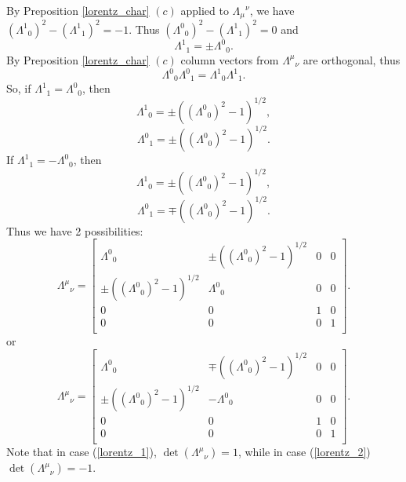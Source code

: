 \documentclass[main.tex]{subfiles}
\begin{document}
By Preposition \ref{lorentz_char} $(c)$ applied to ${\Lambda_\mu}^\nu$, we have  $({\Lambda^1}_0)^2 - ({\Lambda^1}_1)^2 = -1$. Thus $({\Lambda^0}_0)^2 - ({\Lambda^1}_1)^2 = 0$ and 
\begin{equation}
    {\Lambda^1}_1 = \pm {\Lambda^0}_0.
\end{equation}
By Preposition \ref{lorentz_char} $(c)$ column vectors from ${\Lambda^\mu}_\nu$ are orthogonal, thus
\begin{equation}
    {\Lambda^0}_0 {\Lambda^0}_1 =  {\Lambda^1}_0 {\Lambda^1}_1.
\end{equation}
So, if ${\Lambda^1}_1 = {\Lambda^0}_0$, then
\begin{equation}
    {\Lambda^1}_0 = \pm (({\Lambda^0}_0)^2 - 1)^{1/2},
\end{equation}
\begin{equation}
    {\Lambda^0}_1 = \pm (({\Lambda^0}_0)^2 - 1)^{1/2}.
\end{equation}
If ${\Lambda^1}_1 = -{\Lambda^0}_0$, then
\begin{equation}
    {\Lambda^1}_0 = \pm (({\Lambda^0}_0)^2 - 1)^{1/2},
\end{equation}
\begin{equation}
    {\Lambda^0}_1 = \mp (({\Lambda^0}_0)^2 - 1)^{1/2}.
\end{equation}
Thus we have 2 possibilities:
\begin{equation}
\label{lorentz_1}
    {\Lambda^\mu}_\nu =
    \begin{bmatrix}
    {\Lambda^0}_0 & \pm (({\Lambda^0}_0)^2 - 1)^{1/2} & 0 & 0 \\
    \pm (({\Lambda^0}_0)^2 - 1)^{1/2} & {\Lambda^0}_0 & 0 & 0 \\
    0 & 0 & 1 & 0 \\
    0 & 0 & 0 & 1 \\
\end{bmatrix}.
\end{equation}
or
\begin{equation}
\label{lorentz_2}
    {\Lambda^\mu}_\nu =
    \begin{bmatrix}
    {\Lambda^0}_0 & \mp (({\Lambda^0}_0)^2 - 1)^{1/2} & 0 & 0 \\
    \pm (({\Lambda^0}_0)^2 - 1)^{1/2} & -{\Lambda^0}_0 & 0 & 0 \\
    0 & 0 & 1 & 0 \\
    0 & 0 & 0 & 1 \\
\end{bmatrix}.
\end{equation}
Note that in case (\ref{lorentz_1}), $\det({\Lambda^\mu}_\nu) = 1$, while in case  (\ref{lorentz_2}) $\det({\Lambda^\mu}_\nu) = -1$.
\end{document}
